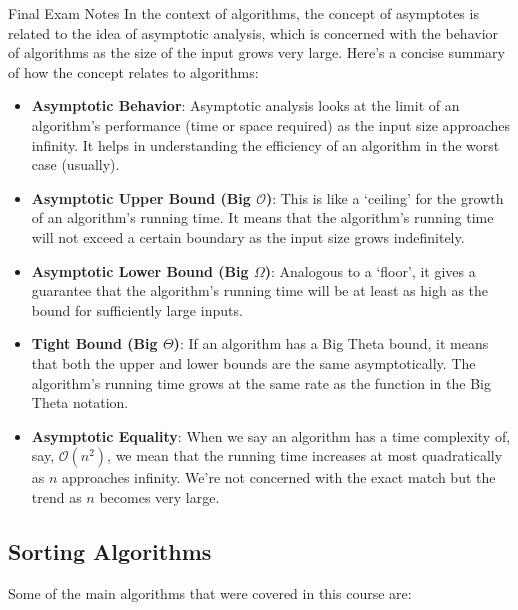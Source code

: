 \begin{examnotes}{Final Exam Notes}
    In the context of algorithms, the concept of asymptotes is related to the idea of asymptotic analysis, which is concerned with the behavior of algorithms as the size of the input grows very large. 
    Here's a concise summary of how the concept relates to algorithms:

    \begin{itemize}
        \item \textbf{Asymptotic Behavior}: Asymptotic analysis looks at the limit of an algorithm's performance (time or space required) as the input size approaches infinity. It helps in understanding 
        the efficiency of an algorithm in the worst case (usually).
        \item \textbf{Asymptotic Upper Bound (Big $\mathcal{O}$)}: This is like a `ceiling' for the growth of an algorithm's running time. It means that the algorithm's running time will not exceed 
        a certain boundary as the input size grows indefinitely.
        \item \textbf{Asymptotic Lower Bound (Big $\Omega$)}: Analogous to a `floor', it gives a guarantee that the algorithm's running time will be at least as high as the bound for sufficiently 
        large inputs.
        \item \textbf{Tight Bound (Big $\Theta$)}: If an algorithm has a Big Theta bound, it means that both the upper and lower bounds are the same asymptotically. The algorithm's running time grows 
        at the same rate as the function in the Big Theta notation.
        \item \textbf{Asymptotic Equality}: When we say an algorithm has a time complexity of, say, $\mathcal{O}(n^{2})$, we mean that the running time increases at most quadratically as $n$ approaches
        infinity. We're not concerned with the exact match but the trend as $n$ becomes very large.
    \end{itemize}

    \subsection*{Sorting Algorithms}

    Some of the main algorithms that were covered in this course are:


\end{examnotes}
